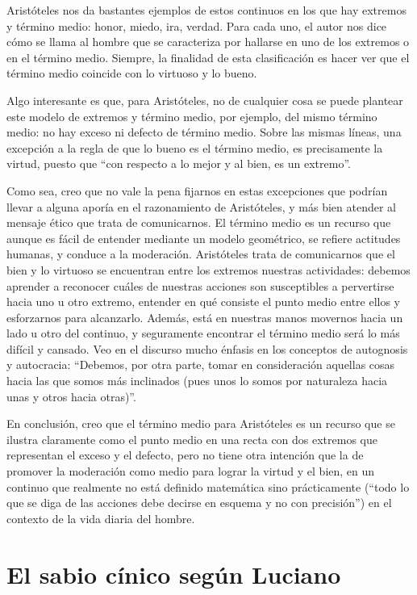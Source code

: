 Aristóteles nos da bastantes ejemplos de
estos continuos en los que hay extremos y
término medio: honor, miedo, ira, verdad.
Para cada uno, el autor nos dice cómo se
llama al hombre que se caracteriza por
hallarse en uno de los extremos o en el
término medio. Siempre, la finalidad de esta
clasificación es hacer ver que el término
medio coincide con lo virtuoso y lo bueno.

Algo interesante es que, para Aristóteles, no
de cualquier cosa se puede plantear este
modelo de extremos y término medio, por
ejemplo, del mismo término medio: no hay
exceso ni defecto de término medio. Sobre las
mismas líneas, una excepción a la regla de
que lo bueno es el término medio, es
precisamente la virtud, puesto que ``con
respecto a lo mejor y al bien, es un
extremo''.

Como sea, creo que no vale la pena fijarnos
en estas excepciones que podrían llevar a
alguna aporía en el razonamiento de
Aristóteles, y más bien atender al mensaje
ético que trata de comunicarnos. El término
medio es un recurso que aunque es fácil de
entender mediante un modelo geométrico, se
refiere actitudes humanas, y conduce a la
moderación. Aristóteles trata de comunicarnos
que el bien y lo virtuoso se encuentran entre
los extremos nuestras actividades: debemos
aprender a reconocer cuáles de nuestras
acciones son susceptibles a pervertirse hacia
uno u otro extremo, entender en qué consiste
el punto medio entre ellos y esforzarnos para
alcanzarlo. Además, está en nuestras manos
movernos hacia un lado u otro del continuo, y
seguramente encontrar el término medio será
lo más difícil y cansado. Veo en el discurso
mucho énfasis en los conceptos de autognosis
y autocracia: ``Debemos, por otra parte,
tomar en consideración aquellas cosas hacia
las que somos más inclinados (pues unos lo
somos por naturaleza hacia unas y otros hacia
otras)''.

En conclusión, creo que el término medio para
Aristóteles es un recurso que se ilustra
claramente como el punto medio en una recta
con dos extremos que representan el exceso y
el defecto, pero no tiene otra intención que
la de promover la moderación como medio para
lograr la virtud y el bien, en un continuo
que realmente no está definido matemática
sino prácticamente (``todo lo que se diga de
las acciones debe decirse en esquema y no con
precisión'') en el contexto de la vida diaria
del hombre.

\section{El sabio cínico según Luciano}
\label{section-sabio-cinico}

